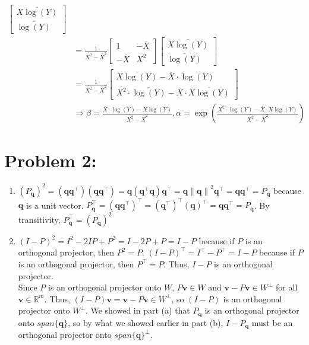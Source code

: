 \documentclass[10pt]{article}
\begin{document}
\begin{enumerate}[label=(\alph*)]
\begin{align*}
        \begin{bmatrix}
            \overline{X\log(Y)}\\
            \overline{\log(Y)}
        \end{bmatrix}\\
        &=\frac{1}{\overline{X^2}-\overline{X}^2}
        \begin{bmatrix}
            1 & -\overline{X}\\
            -\overline{X} & \overline{X^2}
        \end{bmatrix}
        \begin{bmatrix}
            \overline{X\log(Y)}\\
            \overline{\log(Y)}
        \end{bmatrix}\\
        &=\frac{1}{\overline{X^2}-\overline{X}^2}\begin{bmatrix}
            \overline{X\log(Y)}-\overline{X}\cdot\overline{\log(Y)}\\
            \overline{X^2}\cdot\overline{\log(Y)}-\overline{X}\cdot\overline{X\log(Y)}
        \end{bmatrix}\\
        &\Rightarrow \beta=\frac{\overline{X}\cdot\overline{\log(Y)}-\overline{X\log(Y)}}{\overline{X^2}-\overline{X}^2},\alpha=\exp(\frac{\overline{X^2}\cdot\overline{\log(Y)}-\overline{X}\cdot\overline{X\log(Y)}}{\overline{X^2}-\overline{X}^2})
    \end{align*}
\end{enumerate}
\section*{Problem 2:}
\begin{enumerate}[label=(\alph*)]
    \item $(P_\mathbf{q})^2=(\mathbf{q}\mathbf{q}^\top)(\mathbf{q}\mathbf{q}^\top)=\mathbf{q}(\mathbf{q}^\top\mathbf{q})\mathbf{q}^\top=\mathbf{q}{\lVert\mathbf{q}\rVert}^2\mathbf{q}^\top=\mathbf{q}\mathbf{q}^\top=P_\mathbf{q}$ because $\mathbf{q}$ is a unit vector. $P_\mathbf{q}^\top={(\mathbf{q}\mathbf{q}^\top)}^\top={(\mathbf{q}^\top)}^\top{(\mathbf{q})}^\top=\mathbf{q}\mathbf{q}^\top=P_\mathbf{q}$. By transitivity, $P_\mathbf{q}^\top={(P_\mathbf{q})}^2$
    \item ${(I-P)}^2=I^2-2IP+P^2=I-2P+P=I-P$ because if $P$ is an orthogonal projector, then $P^2=P$. ${(I-P)}^\top=I^\top-P^\top=I-P$ because if $P$ is an orthogonal projector, then $P^\top=P$. Thus, $I-P$ is an orthogonal projector.\\
    Since $P$ is an orthogonal projector onto $W$, $P\mathbf{v}\in W$ and $\mathbf{v}-P\mathbf{v}\in W^\perp$ for all $\mathbf{v}\in\mathbb{R}^m$. Thus, $(I-P)\mathbf{v}=\mathbf{v}-P\mathbf{v}\in W^\perp$, so $(I-P)$ is an orthogonal projector onto $W^\perp$. We showed in part (a) that $P_\mathbf{q}$ is an orthogonal projector onto $span\{\mathbf{q}\}$, so by what we showed earlier in part (b), $I-P_\mathbf{q}$ must be an orthogonal projector onto $span\{\mathbf{q}\}^\perp$.
\end{enumerate}
\end{document}
